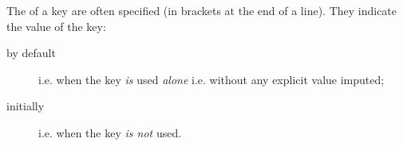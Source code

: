 \documentclass[english,nolocaltoc]{nwejmart}
\newtheorem[style=definition]{fact}
\newtheorem[title=experience]{experience}
\newtheorem[title-plural=rings]{ring}
\newtheorem[title=ideal,title-plural=ideals]{ideal}
\begin{document}
The  of a key are often specified (in
brackets at the end of a line). They indicate the value of the key: 
\begin{description}
\item[by default] i.e. when the key \emph{is} used \emph{alone}
  i.e. without any explicit value imputed;
\item[initially] i.e. when the key \emph{is not} used.
\end{description}
%
\printbibliography[category=documentation]
%
%
\printindex
\end{document}
